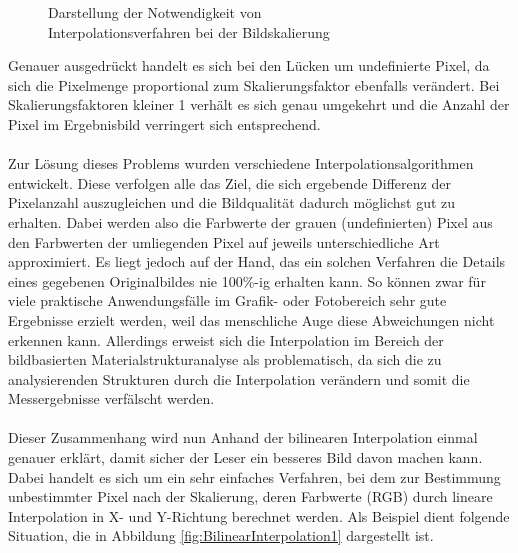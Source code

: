 \documentclass[
fontsize=10pt, 
listof = totoc,
parskip = half	
]{report}
\begin{document}
\begin{figure}[H]
	\caption{Darstellung der Notwendigkeit von\\ Interpolationsverfahren bei der Bildskalierung}
	\label{fig:ScalingProblem}
\end{figure}

\noindent Genauer ausgedrückt handelt es sich bei den Lücken um undefinierte Pixel, da sich die Pixelmenge proportional zum Skalierungsfaktor ebenfalls verändert. Bei Skalierungsfaktoren kleiner 1 verhält es sich genau umgekehrt und die Anzahl der Pixel im Ergebnisbild verringert sich entsprechend.
\\\\
\noindent Zur Lösung dieses Problems wurden verschiedene Interpolationsalgorithmen entwickelt. Diese verfolgen alle das Ziel, die sich ergebende Differenz der Pixelanzahl auszugleichen und die Bildqualität dadurch möglichst gut zu erhalten. Dabei werden also die Farbwerte der grauen (undefinierten) Pixel aus den Farbwerten der umliegenden Pixel auf jeweils unterschiedliche Art approximiert. Es liegt jedoch auf der Hand, das ein solchen Verfahren die Details eines gegebenen Originalbildes nie 100\%-ig erhalten kann. So können zwar für viele praktische Anwendungsfälle im Grafik- oder Fotobereich sehr gute Ergebnisse erzielt werden, weil das menschliche Auge diese Abweichungen nicht erkennen kann. Allerdings erweist sich die Interpolation im Bereich der bildbasierten Materialstrukturanalyse als problematisch, da sich  die zu analysierenden Strukturen durch die Interpolation verändern und somit die Messergebnisse verfälscht werden. 
\\\\
\noindent Dieser Zusammenhang wird nun Anhand der bilinearen Interpolation einmal genauer erklärt, damit sicher der Leser ein besseres Bild davon machen kann. Dabei handelt es sich um ein sehr einfaches Verfahren, bei dem zur Bestimmung unbestimmter Pixel nach der Skalierung, deren Farbwerte (RGB) durch lineare Interpolation in X- und Y-Richtung berechnet werden. Als Beispiel dient folgende Situation, die in Abbildung \ref{fig:BilinearInterpolation1} dargestellt ist.
\end{document}
